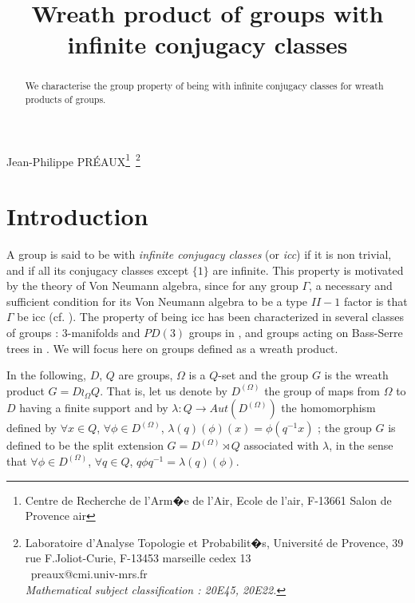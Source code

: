 \documentclass[12pt,oneside]{amsart}
\title{Wreath product of groups with infinite conjugacy classes}
\def\f{\phi}
\def\G{\Gamma}
\begin{document}
\maketitle
\begin{center}
{\sc Jean-Philippe PR\' EAUX}\footnote[1]{Centre de Recherche de
l'Arm�e de l'Air, Ecole de l'air, F-13661 Salon de Provence air}\
\footnote[2]{Laboratoire d'Analyse Topologie et Probabilit�s,
Universit\'e de Provence, 39 rue F.Joliot-Curie, F-13453 marseille
cedex 13\\
 \ preaux@cmi.univ-mrs.fr\\
{\it Mathematical subject classification : 20E45, 20E22.}}
\end{center}


\begin{abstract}
We characterise the group property of being with infinite
conjugacy
classes  for wreath products of groups.\\
\end{abstract}

\section{Introduction}

A group is said to be with {\sl infinite conjugacy classes} (or
{\sl icc}) if it is non trivial, and if all its conjugacy classes
except $\{ 1\}$ are infinite. This property is motivated by the
theory of Von Neumann algebra, since for any group $\G$, a
necessary and sufficient condition for its Von Neumann algebra to
be a type $II-1$ factor is that $\G$ be icc (cf. \cite{roiv}).
%
The property of being icc has been characterized in several
classes of groups : 3-manifolds and $PD(3)$ groups in
\cite{aogf3v}, and groups acting on Bass-Serre trees in
\cite{ydc}. We will focus here on groups defined as a wreath
product.


In the following, $D$, $Q$ are groups, $\Omega$ is a $Q$-set and
the group $G$ is  the wreath product $G=D\wr_\Omega Q$. That is,
let us denote by $D^{(\Omega)}$ the group of maps from $\Omega$ to
$D$ having a finite support and by $\lambda : Q\longrightarrow
Aut(D^{(\Omega)})$ the homomorphism  defined by $\forall x\in Q$,
$\forall\f\in D^{(\Omega)}$, $\lambda(q)(\f)(x)=\f(q^{-1}x)$ ; the
group $G$ is  defined to be the split extension
$G=D^{(\Omega)}\rtimes Q$ associated with $\lambda$, in the sense
that $\forall \f\in D^{(\Omega)}$, $\forall q\in Q$, $q\f
q^{-1}=\lambda(q)(\f)$.
\end{document}
